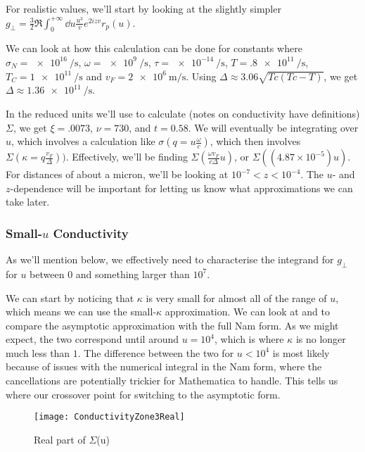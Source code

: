 \documentclass[11pt]{article}
\begin{document}
	For realistic values, we'll start by looking at the slightly simpler $g_\perp = \frac32 \Re \int_0^{+\infty} \dd{u} \frac{u^3}{v} e^{2 i z v} r_p(u)$.

	We can look at how this calculation can be done for constants where $\sigma_N = \SI{e16}{\per\second}$, $\omega = \SI{e9}{\per\second}$, $\tau = \SI{e-14}{\per\second}$, $T = \SI{.8e11}{\per\second}$, $T_C = \SI{1e11}{\per\second}$ and $v_F = \SI{2e6}{\m\per\s}$.
	Using $\Delta \approx 3.06 \sqrt{Tc(Tc - T)}$, we get $\Delta \approx \SI{1.36e11}{\per\second}$.

	In the reduced units we'll use to calculate (notes on conductivity have definitions) $\Sigma$, we get $\xi = .0073$, $\nu = 730$, and $t = 0.58$.
	We will eventually be integrating over $u$, which involves a calculation like $\sigma\left(q = u \frac{\omega}{c}\right)$, which then involves $\Sigma\left(\kappa = q \frac{v_F}{\Delta}\right))$.
	Effectively, we'll be finding $\Sigma\left(\frac{\omega v_F}{c \Delta} u\right)$, or $\Sigma\left(\left( 4.87 \times 10^{-5} \right) u \right)$.
	For distances of about a micron, we'll be looking at $10^{-7} < z < 10^{-4}$.
	The $u$- and $z$-dependence will be important for letting us know what approximations we can take later.

	\subsubsection{Small-$u$ Conductivity} \label{subsubsec:smallucond}

	As we'll mention below, we effectively need to characterise the integrand for $g_\perp$ for $u$ between $0$ and something larger than $10^7$.

	We can start by noticing that $\kappa$ is very small for almost all of the range of $u$, which means we can use the small-$\kappa$ approximation.
	We can look at  and  to compare the asymptotic approximation with the full Nam form.
	As we might expect, the two correspond until around $u = 10^4$, which is where $\kappa$ is no longer much less than $1$.
	The difference between the two for $u < 10^4$ is most likely because of issues with the numerical integral in the Nam form, where the cancellations are potentially trickier for Mathematica to handle.
	This tells us where our crossover point for switching to the asymptotic form.

	\begin{figure}[htp]
		\centering
		\texttt{[image: ConductivityZone3Real]}
		\caption{Real part of $\Sigma$(u)} \label{fig:ConductivityRe}
	\end{figure}
\end{document}
